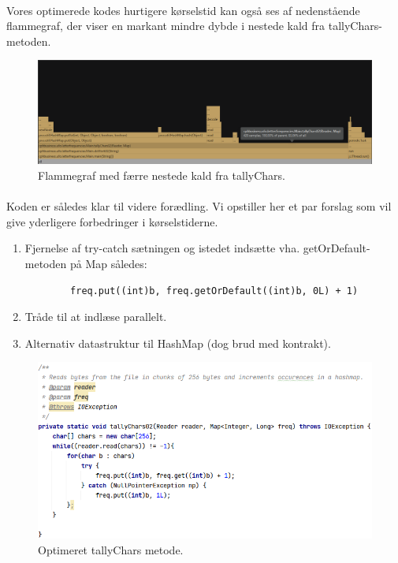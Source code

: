\documentclass{article}
\begin{document}
\paragraph{}
Vores optimerede kodes hurtigere kørselstid kan også ses af nedenstående flammegraf, der viser en markant mindre dybde i nestede kald fra tallyChars-metoden.
\begin{figure}[htb]
    \centering
    \includegraphics[width=\textwidth]{images/tallyChars02.PNG}
    \caption{Flammegraf med færre nestede kald fra tallyChars.}
    \label{fig:optimeret_fg}
\end{figure}
\paragraph{}
Koden er således klar til videre forædling. Vi opstiller her et par forslag som vil give yderligere forbedringer i kørselstiderne.
\begin{enumerate}
    \item Fjernelse af try-catch sætningen og istedet indsætte vha. getOrDefault-metoden på Map således:\begin{verbatim}
        freq.put((int)b, freq.getOrDefault((int)b, 0L) + 1)
    \end{verbatim}    
    \item Tråde til at indlæse parallelt.
    \item Alternativ datastruktur til HashMap (dog brud med kontrakt).
\end{enumerate}
\begin{figure}[htb]
    \centering
    \includegraphics[width=\textwidth]{images/tallyChars02_code.PNG}
    \caption{Optimeret tallyChars metode.}
    \label{fig:optimeret}
\end{figure}
\end{document}
